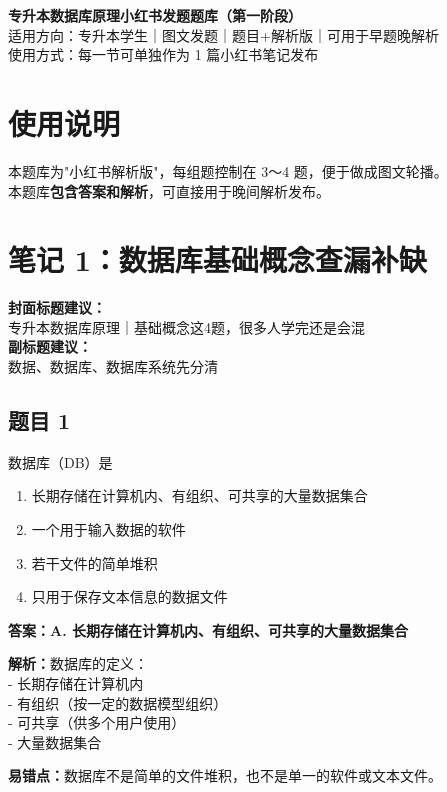 \documentclass[12pt,a4paper]{ctexart}
\begin{document}
\begin{center}
	{\LARGE \textbf{专升本数据库原理小红书发题题库（第一阶段）}}\\[0.6em]
	{\large 适用方向：专升本学生｜图文发题｜题目+解析版｜可用于早题晚解析}\\[0.8em]
	{\normalsize 使用方式：每一节可单独作为 1 篇小红书笔记发布}
\end{center}

\vspace{1em}

\section*{使用说明}
本题库为"小红书解析版"，每组题控制在 3～4 题，便于做成图文轮播。\\
本题库\textbf{包含答案和解析}，可直接用于晚间解析发布。

\newpage

\section{笔记 1：数据库基础概念查漏补缺}
\begin{coverbox}
	\textbf{封面标题建议：}\\
	专升本数据库原理｜基础概念这4题，很多人学完还是会混\\
	\textbf{副标题建议：}\\
	数据、数据库、数据库系统先分清
\end{coverbox}

\subsection*{题目 1}
数据库（DB）是
\begin{enumerate}[label=\Alph*.]
	\item 长期存储在计算机内、有组织、可共享的大量数据集合
	\item 一个用于输入数据的软件
	\item 若干文件的简单堆积
	\item 只用于保存文本信息的数据文件
\end{enumerate}

\begin{answerbox}
	\textbf{答案：A. 长期存储在计算机内、有组织、可共享的大量数据集合}

	\textbf{解析：}数据库的定义：\\
	- 长期存储在计算机内\\
	- 有组织（按一定的数据模型组织）\\
	- 可共享（供多个用户使用）\\
	- 大量数据集合

	\textbf{易错点：}数据库不是简单的文件堆积，也不是单一的软件或文本文件。
\end{answerbox}
\end{document}
